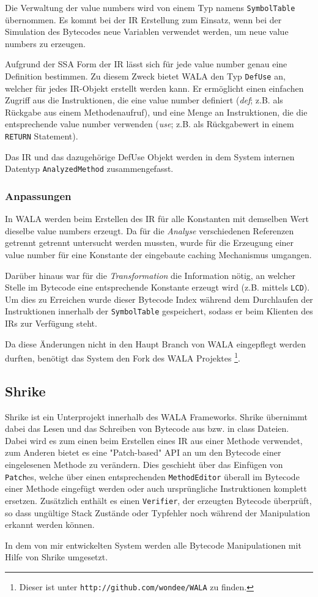 Die Verwaltung der value numbers wird von einem Typ namens \texttt{SymbolTable} übernommen. Es kommt bei der
IR Erstellung zum Einsatz, wenn bei der Simulation des Bytecodes neue Variablen verwendet werden, um neue 
value numbers zu erzeugen.

Aufgrund der SSA Form der IR lässt sich für jede value number genau eine Definition bestimmen. Zu diesem 
Zweck bietet WALA den Typ \texttt{DefUse} an, welcher für jedes IR-Objekt erstellt werden kann. Er ermöglicht
einen einfachen Zugriff aus die Instruktionen, die eine value number definiert (\textit{def}; z.B. als 
Rückgabe aus einem Methodenaufruf), und eine Menge an Instruktionen, die die entsprechende value number 
verwenden (\textit{use}; z.B. als Rückgabewert in einem \texttt{RETURN} Statement).
   
Das IR und das dazugehörige DefUse Objekt werden in dem System internen Datentyp \texttt{AnalyzedMethod} 
zusammengefasst.


\subsubsection{Anpassungen}

In WALA werden beim Erstellen des IR für alle Konstanten mit demselben Wert dieselbe value numbers erzeugt. 
Da für die \textit{Analyse} verschiedenen Referenzen getrennt getrennt untersucht werden mussten, wurde 
für die Erzeugung einer value number für eine Konstante der eingebaute caching Mechanismus umgangen. 

Darüber hinaus war für die \textit{Transformation} die Information nötig, an welcher Stelle im Bytecode eine
entsprechende Konstante erzeugt wird (z.B. mittels \texttt{LCD}). Um dies zu Erreichen wurde dieser Bytecode 
Index während dem Durchlaufen der Instruktionen innerhalb der \texttt{SymbolTable} gespeichert, sodass er 
beim Klienten des IRs zur Verfügung steht.

Da diese Änderungen nicht in den Haupt Branch von WALA eingepflegt werden durften, benötigt das System den 
Fork des WALA Projektes \footnote{Dieser ist unter \texttt{http://github.com/wondee/WALA} zu finden.}.


\subsection{Shrike}

Shrike ist ein Unterprojekt innerhalb des WALA Frameworks. Shrike übernimmt dabei das Lesen und das 
Schreiben von Bytecode aus bzw. in class Dateien. Dabei wird es zum einen beim Erstellen eines IR aus einer 
Methode verwendet, zum Anderen bietet es eine "Patch-based" API an um den Bytecode einer eingelesenen 
Methode zu verändern. Dies geschieht über das Einfügen von \texttt{Patch}es, welche über einen 
entsprechenden \texttt{MethodEditor} überall im Bytecode einer Methode eingefügt werden oder auch 
ursprüngliche Instruktionen komplett ersetzen. Zusätzlich enthält es einen \texttt{Verifier}, der erzeugten 
Bytecode überprüft, so dass ungültige Stack Zustände oder Typfehler noch während der Manipulation erkannt 
werden können. 

In dem von mir entwickelten System werden alle Bytecode Manipulationen mit Hilfe von Shrike umgesetzt. 

